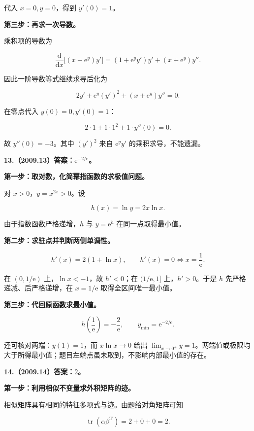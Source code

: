 \documentclass[UTF8,11pt,fontset=windows]{ctexart}
\begin{document}
代入 $x=0,y=0$，得到 $y'(0)=1$。

\textbf{第三步：再求一次导数。}

乘积项的导数为

$$
\frac{\mathrm d}{\mathrm dx}\bigl[(x+\mathrm e^y)y'\bigr]
=(1+\mathrm e^y y')y'+(x+\mathrm e^y)y''.
$$

因此一阶导数等式继续求导后化为

$$
2y'+\mathrm e^y(y')^2+(x+\mathrm e^y)y''=0.
$$

在零点代入 $y(0)=0,y'(0)=1$：

$$
2\cdot1+1\cdot1^2+1\cdot y''(0)=0.
$$

故 $\boxed{y''(0)=-3}$。其中 $(y')^2$ 来自 $\mathrm e^y y'$ 的乘积求导，不能遗漏。

\clearpage

\textbf{13.（2009.13）答案：$\mathrm e^{-2/\mathrm e}$。}

\textbf{第一步：取对数，化简幂指函数的求极值问题。}

对 $x>0$，$y=x^{2x}>0$。设

$$
h(x)=\ln y=2x\ln x.
$$

由于指数函数严格递增，$h$ 与 $y=\mathrm e^h$ 在同一点取得最小值。

\textbf{第二步：求驻点并判断两侧单调性。}

$$
h'(x)=2(1+\ln x),
\qquad h'(x)=0\Longleftrightarrow x=\frac1{\mathrm e}.
$$

在 $(0,1/\mathrm e)$ 上，$\ln x<-1$，故 $h'<0$；在 $(1/\mathrm e,1]$ 上，$h'>0$。于是 $h$ 先严格递减、后严格递增，在 $x=1/\mathrm e$ 取得全区间唯一最小值。

\textbf{第三步：代回原函数求最小值。}

$$
h\left(\frac1{\mathrm e}\right)=-\frac2{\mathrm e},
\qquad
\boxed{y_{\min}=\mathrm e^{-2/\mathrm e}}.
$$

还可核对两端：$y(1)=1$，而 $x\ln x\to0$ 给出 $\lim_{x\to0^+}y=1$。两端值或极限均大于所得最小值；题目左端点虽未取到，不影响内部最小值的存在。

\clearpage

\textbf{14.（2009.14）答案：$2$。}

\textbf{第一步：利用相似不变量求外积矩阵的迹。}

相似矩阵具有相同的特征多项式与迹。由题给对角矩阵可知

$$
\operatorname{tr}(\alpha\beta^{\mathrm T})=2+0+0=2.
$$
\end{document}
